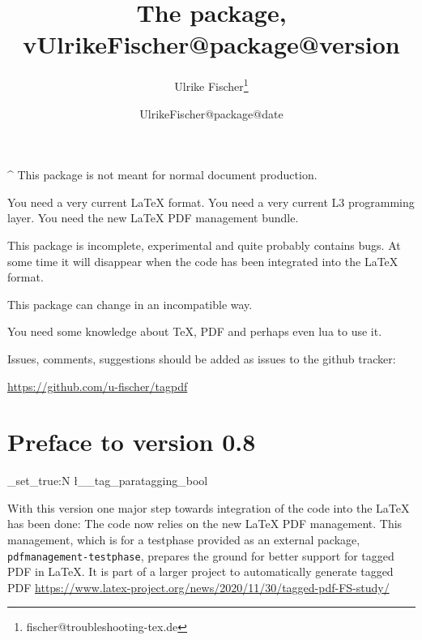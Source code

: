 \documentclass[DIV=12,parskip=half-,bibliography=totoc]{scrartcl}
\title{The \pkg{tagpdf} package, v\csname UlrikeFischer@package@version\endcsname}
\date{\csname UlrikeFischer@package@date\endcsname}
\author{Ulrike Fischer\thanks{fischer@troubleshooting-tex.de}}
\newcommand\PDF{PDF}
\newcommand\parataggingON {\bool_set_true:N \l__tag_paratagging_bool}
\begin{document}

 \maketitle
 \tagmcend
\tagstructend

\begin{tcolorbox}[colframe=red]
\TagP^ This package is not meant for normal document production.

\TagP You need a very current \LaTeX{} format.
      You need a very current L3 programming layer.
      You need the new \LaTeX{} PDF management bundle.

\TagP This package is incomplete, experimental and quite probably contains bugs.
      At some time it will disappear when the code has been integrated into the \LaTeX{} format.

\TagP This package can change in an incompatible way.

\TagP You need some knowledge about \TeX, \PDF{} and perhaps even lua to use it.

\medskip

\TagP Issues, comments, suggestions should be added as issues to the github tracker:\TagPend

\medskip
\centering \url{https://github.com/u-fischer/tagpdf}


\tagstructend
\end{tcolorbox}


\begin{NoHyper} %
\tableofcontents
\end{NoHyper}

\section{Preface to version 0.8}

\parataggingON

With this version one major step towards integration of the code into the \LaTeX{} has been done:
The code now relies on the new \LaTeX{} PDF management. This management, which is for a testphase provided
as an external package, \texttt{pdfmanagement-testphase},
prepares the ground for better support for tagged PDF in \LaTeX{}.
It is part of a larger project to automatically generate tagged PDF \url{https://www.latex-project.org/news/2020/11/30/tagged-pdf-FS-study/}
\end{document}
